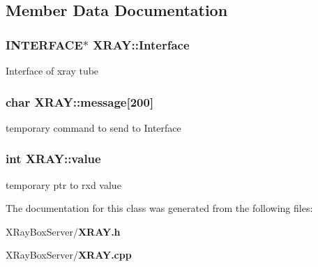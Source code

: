 \subsection{Member Data Documentation}
\subsubsection{\setlength{\rightskip}{0pt plus 5cm}\bf{INTERFACE}$\ast$ \bf{XRAY::Interface}\hspace{0.3cm}{\tt  [private]}}\label{classXRAY_ff9c03d1a47e1e358b032b0c643a5ccb}


Interface of xray tube 
\subsubsection{\setlength{\rightskip}{0pt plus 5cm}char \bf{XRAY::message}[200]\hspace{0.3cm}{\tt  [private]}}\label{classXRAY_8ceaf06251a184214f5de729d545dd5b}


temporary command to send to Interface 
\subsubsection{\setlength{\rightskip}{0pt plus 5cm}int \bf{XRAY::value}\hspace{0.3cm}{\tt  [private]}}\label{classXRAY_b90a926fe975d60482292cda68512527}


temporary ptr to rxd value 

The documentation for this class was generated from the following files:\begin{CompactItemize}
\item 
XRay\-Box\-Server/\bf{XRAY.h}\item 
XRay\-Box\-Server/\bf{XRAY.cpp}\end{CompactItemize}
